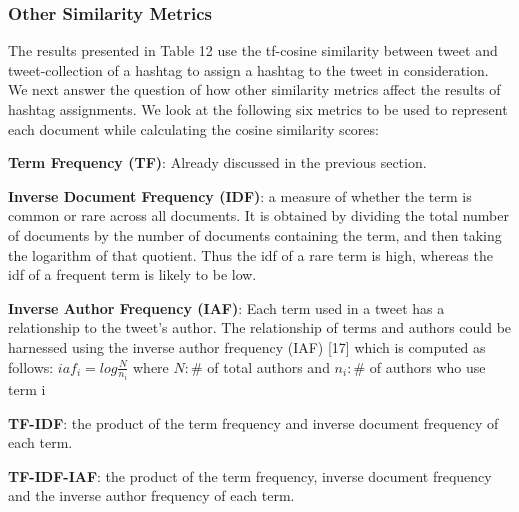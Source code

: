 \documentclass[10pt,a5paper,twoside]{article}
\begin{document}
\subsubsection{Other Similarity Metrics}
The results presented in Table 12 use the tf-cosine similarity between tweet and tweet-collection of a hashtag to assign a hashtag to the tweet in  consideration. We next answer the question of how other similarity metrics affect the results of hashtag assignments. We look at the following six metrics to be used to represent each document while calculating the cosine similarity scores:
\begin{description}
\item{\bf Term Frequency (TF)}: Already discussed in the previous section.
\item{\bf Inverse Document Frequency (IDF)}:  a measure of whether the term is common or rare across all documents. It is obtained by dividing the total number of documents by the number of documents containing the term, and then taking the logarithm of that quotient. Thus the idf of a rare term is high, whereas the idf of a frequent term is likely to be low.
\item{\bf Inverse Author Frequency (IAF)}: Each term used in a tweet has a relationship to the tweet's author. The relationship of terms and authors could be harnessed using the inverse author frequency (IAF) [17] which is computed as follows:
$iaf_i = log \frac{N}{n_i}$
where $N: \#$ of total authors and $n_i: \#$ of authors who use term i
\item{\bf TF-IDF}: the product of the term frequency and inverse document frequency of each term.
\item{\bf TF-IDF-IAF}: the product of the term frequency, inverse document frequency and the inverse author frequency of each term.
\end{description}

\end{document}
